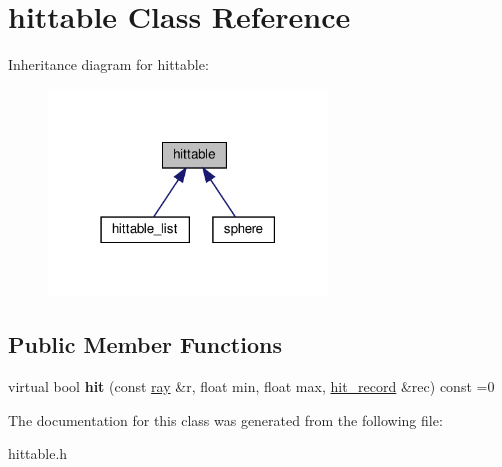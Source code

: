 \hypertarget{classhittable}{}\section{hittable Class Reference}
\label{classhittable}


Inheritance diagram for hittable\+:
\nopagebreak
\begin{figure}[H]
\begin{center}
\leavevmode
\includegraphics[width=210pt]{classhittable__inherit__graph}
\end{center}
\end{figure}
\subsection*{Public Member Functions}
\begin{DoxyCompactItemize}
\item 
\mbox{\label{classhittable_aa1b6671f373a166f9bd44148f2a0fe23}} 
virtual bool {\bfseries hit} (const \hyperlink{classray}{ray} \&r, float min, float max, \hyperlink{structhit__record}{hit\+\_\+record} \&rec) const =0
\end{DoxyCompactItemize}


The documentation for this class was generated from the following file\+:\begin{DoxyCompactItemize}
\item 
hittable.\+h\end{DoxyCompactItemize}
